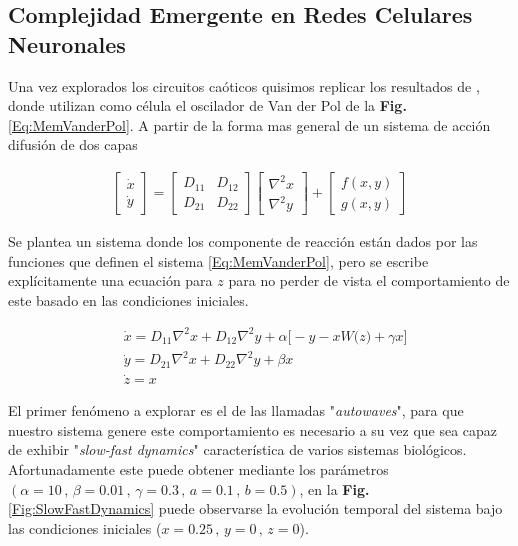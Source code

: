 \documentclass[11pt,letterpaper]{article}
\begin{document}
\begin{multicols*}{2}
\section*{Complejidad Emergente en Redes Celulares Neuronales}

Una vez explorados los circuitos caóticos quisimos replicar los resultados de \cite{Pham2012}\cite{Buscarino2016}\cite{Buscarino2018}, donde utilizan como célula el oscilador de Van der Pol de la \textbf{Fig.} \ref{Eq:MemVanderPol}.
A partir de la forma mas general de un sistema de acción difusión de dos capas 

\begin{align}
\begin{bmatrix}
   \dot{x} \\
   \dot{y}
\end{bmatrix}
=
\begin{bmatrix}
   D_{11} & D_{12} \\
   D_{21} & D_{22}
\end{bmatrix}
\begin{bmatrix}
   \nabla^2 x \\
   \nabla^2 y
\end{bmatrix}
+
\begin{bmatrix}
   f(x,y) \\
   g(x,y)
\end{bmatrix}
\end{align}

Se plantea un sistema donde los componente de reacción están dados por las funciones que definen el sistema \ref{Eq:MemVanderPol}, pero se escribe explícitamente una ecuación para $z$ para no perder de vista el comportamiento de este basado en las condiciones iniciales.

\begin{align}
\label{Eq:ReactionDiffusion}
&\dot{x} = D_{11} \nabla^2 x + D_{12} \nabla^2 y + \alpha\bigg[ - y - x W\big( z\big) + \gamma x \bigg] \nonumber \\
&\dot{y} = D_{21} \nabla^2 x + D_{22} \nabla^2 y + \beta x \\
&\dot{z} = x \nonumber
\end{align}

El primer fenómeno a explorar es el de las llamadas "\textit{autowaves}", para que nuestro sistema genere este comportamiento es necesario a su vez que sea capaz de exhibir "\textit{slow-fast dynamics}" \cite{Perez1993}\cite{Arena1997}característica de varios sistemas biológicos. Afortunadamente este puede obtener mediante los parámetros $(\alpha\!=\!10 \,,\, \beta\!=\!0.01 \,,\, \gamma\!=\!0.3\,,\,a\!=\!0.1 \,,\, b\!=\!0.5)$, en la \textbf{Fig.} \ref{Fig:SlowFastDynamics} puede observarse la evolución temporal del sistema bajo las condiciones iniciales ($x=0.25\,,\,y=0\,,\,z=0$).


\end{multicols*}
\end{document}
